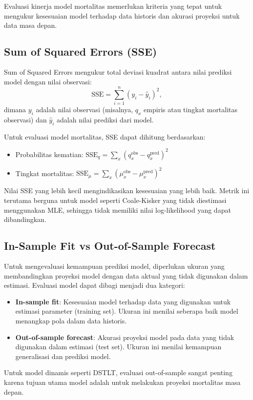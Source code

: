 Evaluasi kinerja model mortalitas memerlukan kriteria yang tepat untuk mengukur kesesuaian model terhadap data historis dan akurasi proyeksi untuk data masa depan.

\subsection{Sum of Squared Errors (SSE)}

Sum of Squared Errors mengukur total deviasi kuadrat antara nilai prediksi model dengan nilai observasi:
\begin{equation}
\text{SSE} = \sum_{i=1}^{n} (y_i - \hat{y}_i)^2,
\label{eq:sse}
\end{equation}
dimana $y_i$ adalah nilai observasi (misalnya, $q_x$ empiris atau tingkat mortalitas observasi) dan $\hat{y}_i$ adalah nilai prediksi dari model.

Untuk evaluasi model mortalitas, SSE dapat dihitung berdasarkan:
\begin{itemize}
    \item Probabilitas kematian: $\text{SSE}_q = \sum_x (q_x^{\text{obs}} - q_x^{\text{pred}})^2$
    \item Tingkat mortalitas: $\text{SSE}_\mu = \sum_x (\mu_x^{\text{obs}} - \mu_x^{\text{pred}})^2$
\end{itemize}

Nilai SSE yang lebih kecil mengindikasikan kesesuaian yang lebih baik. Metrik ini terutama berguna untuk model seperti Coale-Kisker yang tidak diestimasi menggunakan MLE, sehingga tidak memiliki nilai log-likelihood yang dapat dibandingkan.

\subsection{In-Sample Fit vs Out-of-Sample Forecast}

Untuk mengevaluasi kemampuan prediksi model, diperlukan ukuran yang membandingkan proyeksi model dengan data aktual yang tidak digunakan dalam estimasi. Evaluasi model dapat dibagi menjadi dua kategori:

\begin{itemize}
    \item \textbf{In-sample fit}: Kesesuaian model terhadap data yang digunakan untuk estimasi parameter (training set). Ukuran ini menilai seberapa baik model menangkap pola dalam data historis.
    
    \item \textbf{Out-of-sample forecast}: Akurasi proyeksi model pada data yang tidak digunakan dalam estimasi (test set). Ukuran ini menilai kemampuan generalisasi dan prediksi model.
\end{itemize}

Untuk model dinamis seperti DSTLT, evaluasi out-of-sample sangat penting karena tujuan utama model adalah untuk melakukan proyeksi mortalitas masa depan.

